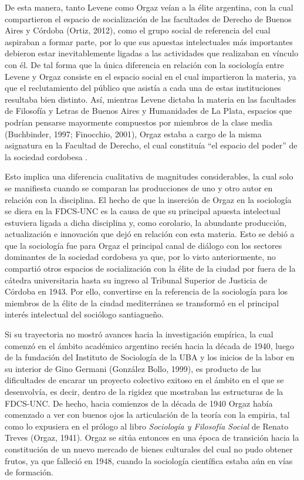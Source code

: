 De esta manera, tanto Levene como Orgaz veían a la élite argentina, con la cual compartieron el espacio de socialización de las facultades de Derecho de Buenos Aires y Córdoba \parencite{277-AGUERO2017}(Ortiz, 2012), como el grupo social de referencia del cual aspiraban a formar parte, por lo que sus apuestas intelectuales más importantes debieron estar inevitablemente ligadas a las actividades que realizaban en vínculo con él. De tal forma que la única diferencia en relación con la sociología entre Levene y Orgaz consiste en el espacio social en el cual impartieron la materia, ya que el reclutamiento del público que asistía a cada una de estas instituciones resultaba bien distinto. Así, mientras Levene dictaba la materia en las facultades de Filosofía y Letras de Buenos Aires y Humanidades de La Plata, espacios que podrían pensarse mayormente compuestos por miembros de la clase media (Buchbinder, 1997; Finocchio, 2001), Orgaz estaba a cargo de la misma asignatura en la Facultad de Derecho, el cual constituía \enquote{el espacio del poder} de la sociedad cordobesa \parencite[39]{1447-CARACCIOLO2010}.

Esto implica una diferencia cualitativa de magnitudes considerables, la cual solo se manifiesta cuando se comparan las producciones de uno y otro autor en relación con la disciplina. El hecho de que la inserción de Orgaz en la sociología se diera en la FDCS-UNC es la causa de que su principal apuesta intelectual estuviera ligada a dicha disciplina y, como corolario, la abundante producción, actualización e innovación que dejó en relación con esta materia. Esto se debió a que la sociología fue para Orgaz el principal canal de diálogo con los sectores dominantes de la sociedad cordobesa ya que, por lo visto anteriormente, no compartió otros espacios de socialización con la élite de la ciudad por fuera de la cátedra universitaria hasta su ingreso al Tribunal Superior de Justicia de Córdoba en 1943. Por ello, convertirse en la referencia de la sociología para los miembros de la élite de la ciudad mediterránea se transformó en el principal interés intelectual del sociólogo santiagueño.

Si su trayectoria no mostró avances hacia la investigación empírica, la cual comenzó en el ámbito académico argentino recién hacia la década de 1940, luego de la fundación del Instituto de Sociología de la UBA y los inicios de la labor en su interior de Gino Germani (González Bollo, 1999), es producto de las dificultades de encarar un proyecto colectivo exitoso en el ámbito en el que se desenvolvía, es decir, dentro de la rigidez que mostraban las estructuras de la FDCS-UNC. De hecho, hacia comienzos de la década de 1940 Orgaz había comenzado a ver con buenos ojos la articulación de la teoría con la empiria, tal como lo expusiera en el prólogo al libro \emph{Sociología y Filosofía Social} de Renato Treves (Orgaz, 1941). Orgaz se sitúa entonces en una época de transición hacia la constitución de un nuevo mercado de bienes culturales del cual no pudo obtener frutos, ya que falleció en 1948, cuando la sociología científica estaba aún en vías de formación.

